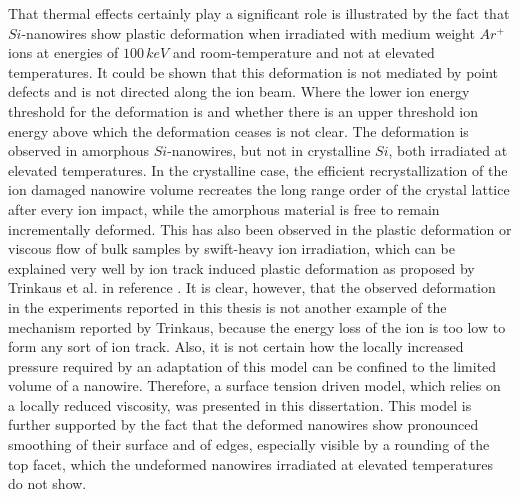 That thermal effects certainly play a significant role is illustrated by the fact that $Si$-nanowires show plastic deformation when irradiated with medium weight $Ar^+$ ions at energies of $100\,keV$ and room-temperature and not at elevated temperatures. It could be shown that this deformation is not mediated by point defects and is not directed along the ion beam. Where the lower ion energy threshold for the deformation is and whether there is an upper threshold ion energy above which the deformation ceases is not clear. The deformation is observed in amorphous $Si$-nanowires, but not in crystalline $Si$, both irradiated at elevated temperatures. In the crystalline case, the efficient recrystallization of the ion damaged nanowire volume recreates the long range order of the crystal lattice after every ion impact, while the amorphous material is free to remain incrementally deformed. This has also been observed in the plastic deformation or viscous flow of bulk samples by swift-heavy ion irradiation, which can be explained very well by ion track induced plastic deformation as proposed by Trinkaus et al. in reference \cite{trinkaus_viscoelastic_1995}. It is clear, however, that the observed deformation in the experiments reported in this thesis is not another example of the mechanism reported by Trinkaus, because the energy loss of the ion is too low to form any sort of ion track. Also, it is not certain how the locally increased pressure required by an adaptation of this model can be confined to the limited volume of a nanowire. Therefore, a surface tension driven model, which relies on a locally reduced viscosity, was presented in this dissertation. This model is further supported by the fact that the deformed nanowires show pronounced smoothing of their surface and of edges, especially visible by a rounding of the top facet, which the undeformed nanowires irradiated at elevated temperatures do not show.

